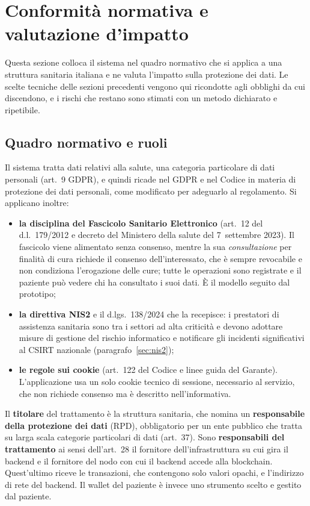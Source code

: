 \section{Conformità normativa e valutazione d'impatto}\label{sec:conformita}

Questa sezione colloca il sistema nel quadro normativo che si applica a una struttura sanitaria italiana e ne valuta l'impatto sulla protezione dei dati. Le scelte tecniche delle sezioni precedenti vengono qui ricondotte agli obblighi da cui discendono, e i rischi che restano sono stimati con un metodo dichiarato e ripetibile.

\subsection{Quadro normativo e ruoli}
Il sistema tratta dati relativi alla salute, una categoria particolare di dati personali (art.~9 GDPR\cite{gdpr}), e quindi ricade nel GDPR e nel Codice in materia di protezione dei dati personali, come modificato per adeguarlo al regolamento\cite{codice-privacy}. Si applicano inoltre:
\begin{itemize}
  \item \textbf{la disciplina del Fascicolo Sanitario Elettronico} (art.~12 del d.l.~179/2012 e decreto del Ministero della salute del 7~settembre 2023\cite{dl179,dm-fse}). Il fascicolo viene alimentato senza consenso, mentre la sua \emph{consultazione} per finalità di cura richiede il consenso dell'interessato, che è sempre revocabile e non condiziona l'erogazione delle cure; tutte le operazioni sono registrate e il paziente può vedere chi ha consultato i suoi dati\cite{garante-fse}. È il modello seguito dal prototipo;
  \item \textbf{la direttiva NIS2} e il d.lgs.~138/2024 che la recepisce\cite{nis2,dlgs138}: i prestatori di assistenza sanitaria sono tra i settori ad alta criticità e devono adottare misure di gestione del rischio informatico e notificare gli incidenti significativi al CSIRT nazionale (paragrafo~\ref{sec:nis2});
  \item \textbf{le regole sui cookie} (art.~122 del Codice e linee guida del Garante\cite{garante-cookie}). L'applicazione usa un solo cookie tecnico di sessione, necessario al servizio, che non richiede consenso ma è descritto nell'informativa.
\end{itemize}

Il \textbf{titolare} del trattamento è la struttura sanitaria, che nomina un \textbf{responsabile della protezione dei dati} (RPD), obbligatorio per un ente pubblico che tratta su larga scala categorie particolari di dati (art.~37). Sono \textbf{responsabili del trattamento} ai sensi dell'art.~28 il fornitore dell'infrastruttura su cui gira il backend e il fornitore del nodo con cui il backend accede alla blockchain. Quest'ultimo riceve le transazioni, che contengono solo valori opachi, e l'indirizzo di rete del backend. Il wallet del paziente è invece uno strumento scelto e gestito dal paziente.

